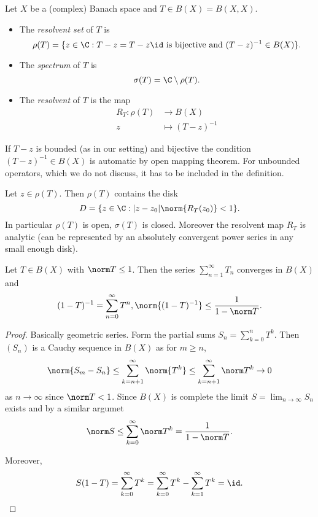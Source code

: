 \documentclass[a4paper]{article}
\begin{document}
\begin{definition}
  Let \(X\) be a (complex) Banach space and \(T \in B(X) = B(X, X)\).
  \begin{itemize}
  \item The \emph{resolvent set} of \(T\) is
    \[
      \rho(T) = \{z \in \C: T - z = T - z \id \text{ is bijective and } (T - z)^{-1} \in B(X)\}.
    \]
  \item The \emph{spectrum} of \(T\) is
    \[
      \sigma(T) = \C \setminus \rho(T).
    \]
  \item The \emph{resolvent} of \(T\) is the map
    \begin{align*}
      R_T: \rho(T) &\to B(X) \\
      z &\mapsto (T - z)^{-1}
    \end{align*}
  \end{itemize}
\end{definition}

\begin{remark}
  If \(T - z\) is bounded (as in our setting) and bijective the condition \((T - z)^{-1} \in B(X)\) is automatic by open mapping theorem. For unbounded operators, which we do not discuss, it has to be included in the definition.
\end{remark}

\begin{proposition}
  \label{prop:openness of resolvent set}
  Let \(z \in \rho(T)\). Then \(\rho(T)\) contains the disk
  \[
    D = \{z \in \C: |z - z_0| \norm{R_T(z_0)} < 1\}.
  \]
  In particular \(\rho(T)\) is open, \(\sigma(T)\) is closed. Moreover the resolvent map \(R_T\) is analytic (can be represented by an absolutely convergent power series in any small enough disk).
\end{proposition}

\begin{lemma}
  Let \(T\in B(X)\) with \(\norm T \leq 1\). Then the series \(\sum_{n = 1}^\infty T_n\) converges in \(B(X)\) and
  \[
    (1 - T)^{-1} = \sum_{n = 0}^\infty T^n,
    \norm{(1 - T)^{-1}} \leq \frac{1}{1 - \norm T}.
  \]
\end{lemma}

\begin{proof}
  Basically geometric series. Form the partial sums \(S_n = \sum_{k = 0}^n T^k\). Then \((S_n)\) is a Cauchy sequence in \(B(X)\) as for \(m \geq n\),
  \[
    \norm{S_m - S_n}
    \leq \sum_{k = n + 1}^\infty \norm{T^k}
    \leq \sum_{k = n + 1}^\infty \norm T^k
    \to 0
  \]
  as \(n \to \infty\) since \(\norm T < 1\). Since \(B(X)\) is complete the limit \(S = \lim_{n \to \infty} S_n\) exists and by a similar argumet
  \[
    \norm S
    \leq \sum_{k = 0}^\infty \norm T^k
    = \frac{1}{1 - \norm T}.
  \]

  Moreover,
  \[
    S(1 - T)
    = \sum_{k = 0}^\infty T^k = \sum_{k = 0}^\infty T^k - \sum_{k = 1}^\infty T^k = \id.
  \]
\end{proof}
\end{document}
